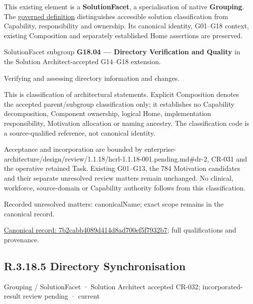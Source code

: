 This existing element is a \textbf{SolutionFacet}, a specialisation of native
\textbf{Grouping}. The \href{\detokenize{../../../../../../../governance/continuum-representation.md#solutionfacet-classification--1119-candidate}}{governed definition}
distinguishes accessible solution classification from Capability, responsibility
and ownership. Its canonical identity, G01–G18 context, existing Composition
and separately established Home assertions are preserved.



SolutionFacet subgroup \textbf{G18.04 — Directory Verification and Quality} in the Solution Architect-accepted G14–G18 extension.



Verifying and assessing directory information and changes.



This is classification of architectural statements. Explicit Composition denotes the accepted parent/subgroup classification only; it establishes no Capability decomposition, Component ownership, logical Home, implementation responsibility, Motivation allocation or naming ancestry. The classification code is a source-qualified reference, not canonical identity.



Acceptance and incorporation are bounded by enterprise-architecture/design/review/1.1.18/hcrl-1.1.18-001.pending.md\#dr-2, CR-031 and the operative retained Task. Existing G01–G13, the 784 Motivation candidates and their separate unresolved review matters remain unchanged. No clinical, workforce, source-domain or Capability authority follows from this classification.


{\small Recorded unresolved matters: canonicalName; exact scope remains in the canonical record.}\par
{\footnotesize \href{../../../../../../../continuum/grouping/7b2cabb4089d414d8ad700ef5f7932b7.md}{Canonical record: 7b2cabb4089d414d8ad700ef5f7932b7}; full qualifications and provenance.}\par
\subsection*{R.3.18.5 Directory Synchronisation}
\label{navigation:R.3.18.5}

\label{element:e1ed88f315a84116a77ead21d8fe1792}
{\small Grouping / SolutionFacet · Solution Architect accepted CR-032; incorporated-result review pending · current}\par

